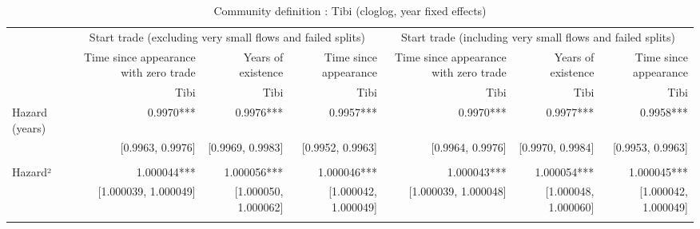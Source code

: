 \begin{table}[!h]
\caption{Community definition : Tibi (cloglog, year fixed effects)}
\centering
\begin{tabular}{lllllll}
\cline{1-7}
\multicolumn{1}{c}{} &
  \multicolumn{3}{|c}{Start trade (excluding very small flows and failed splits)} &
  \multicolumn{3}{c}{Start trade (including very small flows and failed splits)} \\
\multicolumn{1}{c}{} &
  \multicolumn{1}{|r}{Time since appearance with zero trade} &
  \multicolumn{1}{r}{Years of existence} &
  \multicolumn{1}{r}{Time since appearance} &
  \multicolumn{1}{r}{Time since appearance with zero trade} &
  \multicolumn{1}{r}{Years of existence} &
  \multicolumn{1}{r}{Time since appearance} \\
\multicolumn{1}{c}{} &
  \multicolumn{1}{|r}{Tibi} &
  \multicolumn{1}{r}{Tibi} &
  \multicolumn{1}{r}{Tibi} &
  \multicolumn{1}{r}{Tibi} &
  \multicolumn{1}{r}{Tibi} &
  \multicolumn{1}{r}{Tibi} \\
\cline{1-7}
\multicolumn{1}{l}{Hazard (years)} &
  \multicolumn{1}{|r}{0.9970***} &
  \multicolumn{1}{r}{0.9976***} &
  \multicolumn{1}{r}{0.9957***} &
  \multicolumn{1}{r}{0.9970***} &
  \multicolumn{1}{r}{0.9977***} &
  \multicolumn{1}{r}{0.9958***} \\
\multicolumn{1}{l}{} &
  \multicolumn{1}{|r}{[0.9963, 0.9976]} &
  \multicolumn{1}{r}{[0.9969, 0.9983]} &
  \multicolumn{1}{r}{[0.9952, 0.9963]} &
  \multicolumn{1}{r}{[0.9964, 0.9976]} &
  \multicolumn{1}{r}{[0.9970, 0.9984]} &
  \multicolumn{1}{r}{[0.9953, 0.9963]} \\
\multicolumn{1}{l}{} &
  \multicolumn{1}{|r}{} &
  \multicolumn{1}{r}{} &
  \multicolumn{1}{r}{} &
  \multicolumn{1}{r}{} &
  \multicolumn{1}{r}{} &
  \multicolumn{1}{r}{} \\
\multicolumn{1}{l}{Hazard²} &
  \multicolumn{1}{|r}{1.000044***} &
  \multicolumn{1}{r}{1.000056***} &
  \multicolumn{1}{r}{1.000046***} &
  \multicolumn{1}{r}{1.000043***} &
  \multicolumn{1}{r}{1.000054***} &
  \multicolumn{1}{r}{1.000045***} \\
\multicolumn{1}{l}{} &
  \multicolumn{1}{|r}{[1.000039, 1.000049]} &
  \multicolumn{1}{r}{[1.000050, 1.000062]} &
  \multicolumn{1}{r}{[1.000042, 1.000049]} &
  \multicolumn{1}{r}{[1.000039, 1.000048]} &
  \multicolumn{1}{r}{[1.000048, 1.000060]} &
  \multicolumn{1}{r}{[1.000042, 1.000049]} \\
\multicolumn{1}{l}{} &
  \multicolumn{1}{|r}{} &
  \multicolumn{1}{r}{} &
  \multicolumn{1}{r}{} &
  \multicolumn{1}{r}{} &

\end{tabular}
\end{table}
